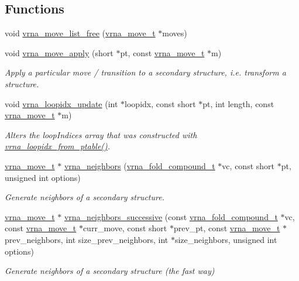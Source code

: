 \subsection*{Functions}
\begin{DoxyCompactItemize}
\item 
void \hyperlink{group__neighbors_gad085062ae3aa7ee20783debe4a906fad}{vrna\+\_\+move\+\_\+list\+\_\+free} (\hyperlink{group__neighbors_structvrna__move__s}{vrna\+\_\+move\+\_\+t} $\ast$moves)
\item 
void \hyperlink{group__neighbors_gacdbc5f609b46aeb07d2c7e015677a1e0}{vrna\+\_\+move\+\_\+apply} (short $\ast$pt, const \hyperlink{group__neighbors_structvrna__move__s}{vrna\+\_\+move\+\_\+t} $\ast$m)
\begin{DoxyCompactList}\small\item\em Apply a particular move / transition to a secondary structure, i.\+e. transform a structure. \end{DoxyCompactList}\item 
void \hyperlink{group__neighbors_ga5ceb55ee56494b1f5b7aaa758cb722d1}{vrna\+\_\+loopidx\+\_\+update} (int $\ast$loopidx, const short $\ast$pt, int length, const \hyperlink{group__neighbors_structvrna__move__s}{vrna\+\_\+move\+\_\+t} $\ast$m)
\begin{DoxyCompactList}\small\item\em Alters the loop\+Indices array that was constructed with \hyperlink{group__struct__utils_ga03e15af299be0866ff21da880c74b92e}{vrna\+\_\+loopidx\+\_\+from\+\_\+ptable()}. \end{DoxyCompactList}\item 
\hyperlink{group__neighbors_structvrna__move__s}{vrna\+\_\+move\+\_\+t} $\ast$ \hyperlink{group__neighbors_gab1473d856b15da2120fe648977798ad5}{vrna\+\_\+neighbors} (\hyperlink{group__fold__compound_ga1b0cef17fd40466cef5968eaeeff6166}{vrna\+\_\+fold\+\_\+compound\+\_\+t} $\ast$vc, const short $\ast$pt, unsigned int options)
\begin{DoxyCompactList}\small\item\em Generate neighbors of a secondary structure. \end{DoxyCompactList}\item 
\hyperlink{group__neighbors_structvrna__move__s}{vrna\+\_\+move\+\_\+t} $\ast$ \hyperlink{group__neighbors_gae5aaa1c5a1f22e889843f3edbdd04714}{vrna\+\_\+neighbors\+\_\+successive} (const \hyperlink{group__fold__compound_ga1b0cef17fd40466cef5968eaeeff6166}{vrna\+\_\+fold\+\_\+compound\+\_\+t} $\ast$vc, const \hyperlink{group__neighbors_structvrna__move__s}{vrna\+\_\+move\+\_\+t} $\ast$curr\+\_\+move, const short $\ast$prev\+\_\+pt, const \hyperlink{group__neighbors_structvrna__move__s}{vrna\+\_\+move\+\_\+t} $\ast$prev\+\_\+neighbors, int size\+\_\+prev\+\_\+neighbors, int $\ast$size\+\_\+neighbors, unsigned int options)
\begin{DoxyCompactList}\small\item\em Generate neighbors of a secondary structure (the fast way) \end{DoxyCompactList}\end{DoxyCompactItemize}


